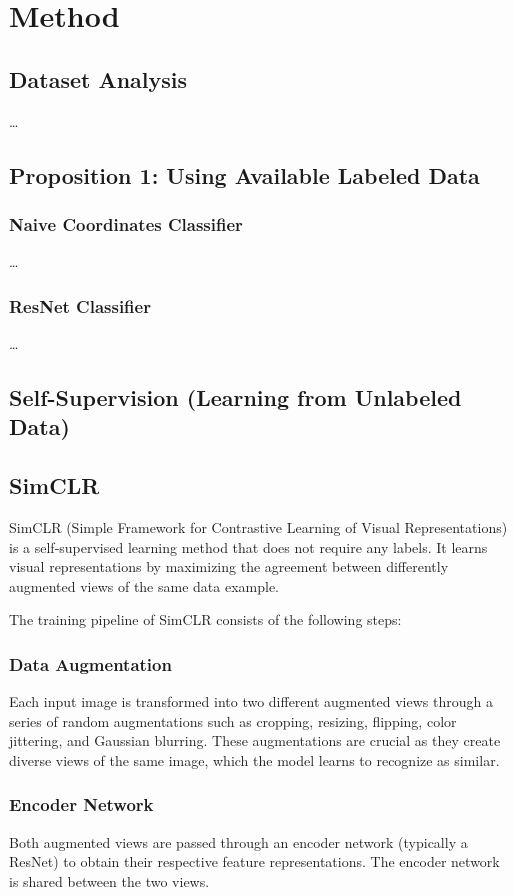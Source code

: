\documentclass{article}
\begin{document}
\section{Method}\label{sec:method}

\subsection{Dataset Analysis}
\dots

\subsection{Proposition 1: Using Available Labeled Data}
\subsubsection{Naive Coordinates Classifier}
\dots

\subsubsection{ResNet Classifier}
\dots

\subsection{Self-Supervision (Learning from Unlabeled Data)}

\subsection{SimCLR}
SimCLR (Simple Framework for Contrastive Learning of Visual Representations) is
a self-supervised learning method that does not require any labels. It learns
visual representations by maximizing the agreement between differently
augmented views of the same data example.

The training pipeline of SimCLR consists of the following steps:

\subsubsection{Data Augmentation}
Each input image is transformed into two different augmented views through a
series of random augmentations such as cropping, resizing, flipping, color
jittering, and Gaussian blurring. These augmentations are crucial as they
create diverse views of the same image, which the model learns to recognize as
similar.

\subsubsection{Encoder Network}
Both augmented views are passed through an encoder network (typically a ResNet)
to obtain their respective feature representations. The encoder network is
shared between the two views.
\end{document}
